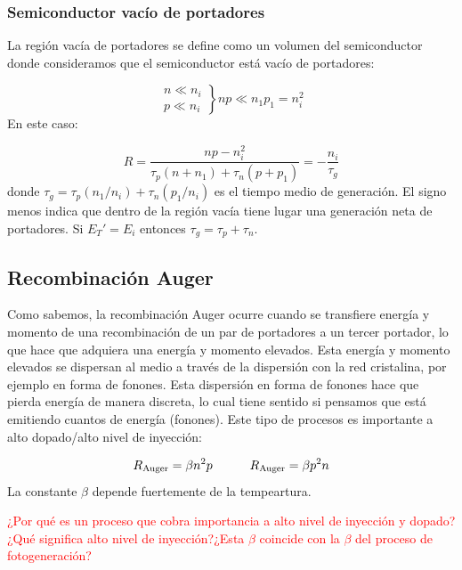 \subsubsection{Semiconductor vacío de portadores}

La región vacía de portadores se define como un volumen del semiconductor donde consideramos que el semiconductor está vacío de portadores:

\begin{equation}
	\left. \begin{matrix}
		n \ll n_i \\
		p \ll n_i
	\end{matrix} \right\rbrace np \ll n_1 p_1 = n_i^2
\end{equation}
En este caso:

\begin{equation}
	R = \frac{np-n_i^2}{\tau_p (n+n_1)+\tau_n(p+p_1)} = - \frac{n_i}{\tau_g}
\end{equation}
donde $\tau_g = \tau_p (n_1/n_i) + \tau_n (p_1 / n_i)$ es el tiempo medio de generación. El signo menos indica que dentro de la región vacía tiene lugar una generación neta de portadores. Si $E_T'=E_i$ entonces $\tau_g=\tau_p+\tau_n$.

\subsection{Recombinación Auger}

Como sabemos, la recombinación Auger ocurre cuando se transfiere energía y momento de una recombinación de un par de portadores a un tercer portador, lo que hace que adquiera una energía y momento elevados. Esta energía y momento elevados se dispersan al medio a través de la dispersión con la red cristalina, por ejemplo en forma de fonones. Esta dispersión en forma de fonones hace que pierda energía de manera discreta, lo cual tiene sentido si pensamos que está emitiendo cuantos de energía (fonones). Este tipo de procesos es importante a alto dopado/alto nivel de inyección:

\begin{equation}
	R_{\text{Auger}} = \beta n^2 p \quad \quad \quad R_{\text{Auger}} = \beta p^2 n
\end{equation}
La constante $\beta$ depende fuertemente de la tempeartura. 

\begin{Anotacion}
	\textcolor{red}{¿Por qué es un proceso que cobra importancia a alto nivel de inyección y dopado?¿Qué significa alto nivel de inyección?¿Esta $\beta$ coincide con la $\beta$ del proceso de fotogeneración?}
\end{Anotacion}

